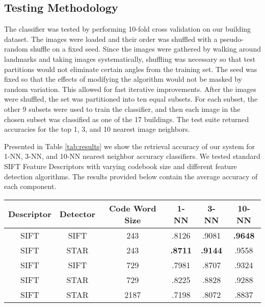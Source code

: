 \subsection{Testing Methodology}

The classifier was tested by performing 10-fold cross validation on our building dataset. 
The images were loaded and their order was shuffled with a pseudo-random shuffle on a fixed seed. 
Since the images were gathered by walking around landmarks and taking images systematically, shuffling was necessary so that test partitions would not eliminate certain angles from the training set. 
The seed was fixed so that the effects of modifying the algorithm would not be masked by random variation. This allowed for fast iterative improvements. After the images were shuffled, the set was partitioned into ten equal subsets. 
For each subset, the other 9 subsets were used to train the classifier, and then each image in the chosen subset was classified as one of the 17 buildings. 
The test suite returned accuracies for the top 1, 3, and 10 nearest image neighbors.


Presented in Table \ref{tab:results} we show the retrieval accuracy of our system for 1-NN, 3-NN, and 10-NN nearest neighbor accuracy classifiers.
We tested standard SIFT Feature Descriptors with varying codebook size and different feature detection algorithms.
The results provided below contain the average accuracy of each component.

\begin{table*}[ht!]
\label{tab:results}
\centering
\begin{tabular}{| c | c | c | c | c | c |}
\hline
Descriptor & Detector & Code Word Size & 1-NN & 3-NN & 10-NN\\ \hline
SIFT & SIFT & 243 & .8126 & .9081  & \textbf{.9648}  \\ \hline
SIFT & STAR & 243 & \textbf{.8711} & \textbf{.9144} & .9558 \\ \hline
SIFT & SIFT & 729 & .7981 & .8707 & .9324 \\ \hline
SIFT & STAR & 729 & .8225 & .8828 & .9288 \\ \hline
SIFT & STAR & 2187 & .7198 & .8072 & .8837\\ \hline
\end{tabular}
\vspace*{10pt}
\caption{Retrieval Accuracy}
\end{table*}

